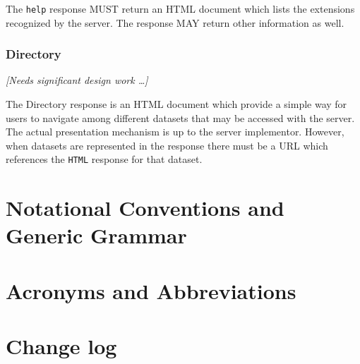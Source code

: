 \documentclass{article}
\begin{document}
The \texttt{help} response MUST return an \ac{HTML} document which lists
the extensions recognized by the server. The response MAY return other
information as well.

\subsubsection{Directory}
\label{sec:dir}
\emph{[Needs significant design work \ldots]}

The Directory response is an \ac{HTML} document which provide a simple way
for users to navigate among different datasets that may be accessed with the
server. The actual presentation mechanism is up to the server implementor.
However, when datasets are represented in the response there must be a
\ac{URL} which references the \texttt{HTML} response for that dataset.


\T{}
\T\raggedright


\T\appendix

\section{Notational Conventions and Generic Grammar}
\label{app:grammar}


\section{Acronyms and Abbreviations}
\begin{acronym}


\end{acronym}

\section{Change log}
\end{document}
